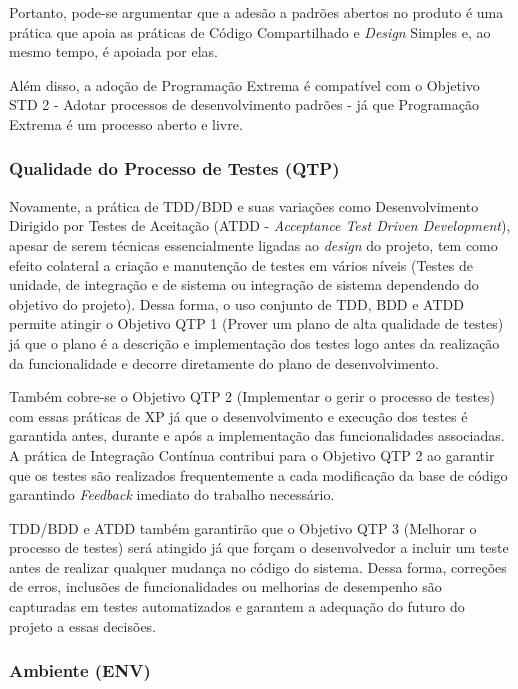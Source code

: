 Portanto, pode-se argumentar que a adesão a padrões abertos no produto
é uma prática que apoia as práticas de Código Compartilhado e
\textit{Design} Simples e, ao mesmo tempo, é apoiada por elas.

Além disso, a adoção de Programação Extrema é compatível com o
Objetivo STD 2 - Adotar processos de desenvolvimento padrões - já que
Programação Extrema é um processo aberto e livre.

\subsubsection{Qualidade do Processo de Testes (QTP)}
\label{sec:+qtp}

Novamente, a prática de TDD/BDD e suas variações como Desenvolvimento
Dirigido por Testes de Aceitação (ATDD - \textit{Acceptance Test
  Driven Development}), apesar de serem técnicas essencialmente ligadas
ao \textit{design} do projeto, tem como efeito colateral a criação e
manutenção de testes em vários níveis (Testes de unidade, de integração
e de sistema ou integração de sistema dependendo do objetivo do
projeto). Dessa forma, o uso conjunto de TDD, BDD e ATDD permite
atingir o Objetivo QTP 1 (Prover um plano de alta qualidade de testes)
já que o plano é a descrição e implementação dos testes logo antes da
realização da funcionalidade e decorre diretamente do plano de desenvolvimento.

Também cobre-se o Objetivo QTP 2 (Implementar o gerir o processo de
testes) com essas práticas de XP já que o desenvolvimento e execução
dos testes é garantida antes, durante e após a implementação das
funcionalidades associadas. A prática de Integração
Contínua contribui para o Objetivo QTP 2 ao garantir que os testes são
realizados frequentemente a cada modificação da base de código
garantindo \textit{Feedback} imediato do trabalho necessário.

TDD/BDD e ATDD também garantirão que o Objetivo QTP 3 (Melhorar o
processo de testes) será atingido já que forçam o desenvolvedor a
incluir um teste antes de realizar qualquer mudança no código do
sistema. Dessa forma, correções de erros, inclusões de funcionalidades
ou melhorias de desempenho são capturadas em testes automatizados e
garantem a adequação do futuro do projeto a essas decisões.

\subsubsection{Ambiente (ENV)}
\label{sec:+env}

